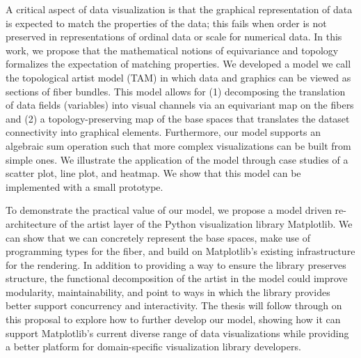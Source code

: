  A critical aspect of data visualization is that the graphical representation of data is expected to match the properties of the data; this fails when order is not preserved in representations of ordinal data or scale for numerical data. In this work, we propose that the mathematical notions of equivariance and topology formalizes the expectation of matching properties. We developed a model we call the topological artist model (TAM) in which data and graphics can be viewed as sections of fiber bundles. This model allows for (1) decomposing the translation of data fields (variables) into visual channels via an equivariant map on the fibers and (2) a topology-preserving map of the base spaces that translates the dataset connectivity into graphical elements. Furthermore, our model supports an algebraic sum operation such that more complex visualizations can be built from simple ones. We illustrate the application of the model through case studies of a scatter plot, line plot, and heatmap. We show that this model can be implemented with a small prototype.

To demonstrate the practical value of our model, we propose a model driven re-architecture of the artist layer of the Python visualization library Matplotlib. We can show that we can concretely represent the base spaces, make use of programming types for the fiber, and build on Matplotlib's existing infrastructure for the rendering. In addition to providing a way to ensure the library preserves structure, the functional decomposition of the artist in the model could improve modularity, maintainability, and point to ways in which the library provides better support concurrency and interactivity. The thesis will follow through on this proposal to explore how to further develop our model, showing how it can support Matplotlib's current diverse range of data visualizations while providing a better platform for domain-specific visualization library developers.
